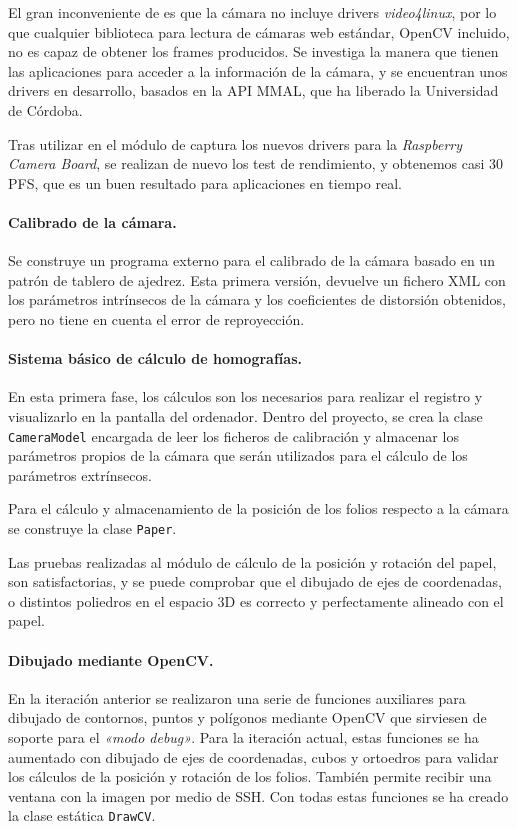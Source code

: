 El gran inconveniente de es que la cámara no incluye drivers \textit{video4linux}, por lo que cualquier biblioteca para lectura de cámaras web estándar, OpenCV incluido, no es capaz de obtener los frames producidos. Se investiga la manera que tienen las aplicaciones para acceder a la información de la cámara, y se encuentran unos drivers en desarrollo, basados en la API MMAL, que ha liberado la Universidad de Córdoba.

Tras utilizar en el módulo de captura los nuevos drivers para la \textit{Raspberry Camera Board}, se realizan de nuevo los test de rendimiento, y obtenemos casi 30 PFS, que es un buen resultado para aplicaciones en tiempo real.

\paragraph{Calibrado de la cámara.}
Se construye un programa externo para el calibrado de la cámara basado en un patrón de tablero de ajedrez. Esta primera versión, devuelve un fichero XML con los parámetros intrínsecos de la cámara y los coeficientes de distorsión obtenidos, pero no tiene en cuenta el error de reproyección.

\paragraph{Sistema básico de cálculo de homografías.} 
En esta primera fase, los cálculos son los necesarios para realizar el registro y visualizarlo en la pantalla del ordenador. Dentro del proyecto, se crea la clase \texttt{CameraModel} encargada de leer los ficheros de calibración y almacenar los parámetros propios de la cámara que serán utilizados para el cálculo de los parámetros extrínsecos. 

Para el cálculo y almacenamiento de la posición de los folios respecto a la cámara se construye la clase \texttt{Paper}.

Las pruebas realizadas al módulo de cálculo de la posición y rotación del papel, son satisfactorias, y se puede comprobar que el dibujado de ejes de coordenadas, o distintos poliedros en el espacio 3D es correcto y perfectamente alineado con el papel. 

\paragraph{Dibujado mediante OpenCV.}
En la iteración anterior se realizaron una serie de funciones auxiliares para dibujado de contornos, puntos y polígonos mediante OpenCV que sirviesen de soporte para el \textit{«modo debug»}. Para la iteración actual, estas funciones se ha aumentado con dibujado de ejes de coordenadas, cubos y ortoedros para validar los cálculos de la posición y rotación de los folios. También permite recibir una ventana con la imagen por medio de SSH. Con todas estas funciones se ha creado la clase estática \texttt{DrawCV}. 

